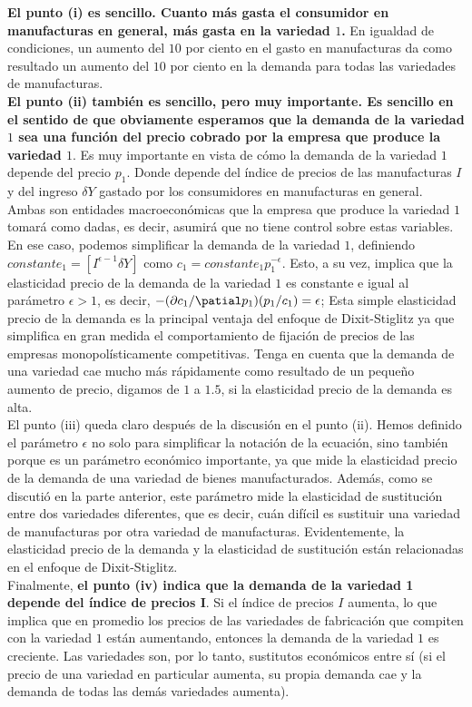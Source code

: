 \textbf{El punto (i) es sencillo. Cuanto más gasta el consumidor en manufacturas en general, más gasta en la variedad $1$.} En igualdad de condiciones, un aumento del $10$ por ciento en el gasto en manufacturas da como resultado un aumento del $10$ por ciento en la demanda para todas las variedades de manufacturas.\\
\textbf{El punto (ii) también es sencillo, pero muy importante. Es sencillo en el sentido de que obviamente esperamos que la demanda de la variedad $1$ sea una función del precio cobrado por la empresa que produce la variedad $1$}. Es muy importante en vista de cómo la demanda de la variedad $1$ depende del precio $p_1$. Donde depende del índice de precios de las manufacturas $I$ y del ingreso $\delta Y$ gastado por los consumidores en manufacturas en general. Ambas son entidades macroeconómicas que la empresa que produce la variedad $1$ tomará como dadas, es decir, asumirá que no tiene control sobre estas variables. En ese caso, podemos simplificar la demanda de la variedad $1$, definiendo $constante_1 = [I^{\epsilon-1} \delta Y]$ como $c_1 = constante_1 p_1^{-\epsilon}$. Esto, a su vez, implica que la elasticidad precio de la demanda de la variedad $1$ es constante e igual al parámetro $\epsilon > 1$, es decir, $-(\partial c_1/\patial p_1)(p_1/c_1) =\epsilon$;  Esta simple elasticidad precio de la demanda es la principal ventaja del enfoque de Dixit-Stiglitz ya que simplifica en gran medida el comportamiento de fijación de precios de las empresas monopolísticamente competitivas. Tenga en cuenta que la demanda de una variedad cae mucho más rápidamente como resultado de un pequeño aumento de precio, digamos de $1$ a $1.5$, si la elasticidad precio de la demanda es alta.\\
El punto (iii) queda claro después de la discusión en el punto (ii). Hemos definido el parámetro $\epsilon$ no solo para simplificar la notación de la ecuación, sino también porque es un parámetro económico importante, ya que mide la elasticidad precio de la demanda de una variedad de bienes manufacturados. Además, como se discutió en la parte anterior, este parámetro mide la elasticidad de sustitución entre dos variedades diferentes, que es decir, cuán difícil es sustituir una variedad de manufacturas por otra variedad de manufacturas. Evidentemente, la elasticidad precio de la demanda y la elasticidad de sustitución están relacionadas en el enfoque de Dixit-Stiglitz.\\
Finalmente, \textbf{el punto (iv) indica que la demanda de la variedad 1 depende del índice de precios I}. Si el índice de precios $I$ aumenta, lo que implica que en promedio los precios de las variedades de fabricación que compiten con la variedad $1$ están aumentando, entonces la demanda de la variedad $1$ es creciente. Las variedades son, por lo tanto, sustitutos económicos entre sí (si el precio de una variedad en particular aumenta, su propia demanda cae y la demanda de todas las demás variedades aumenta).\\


